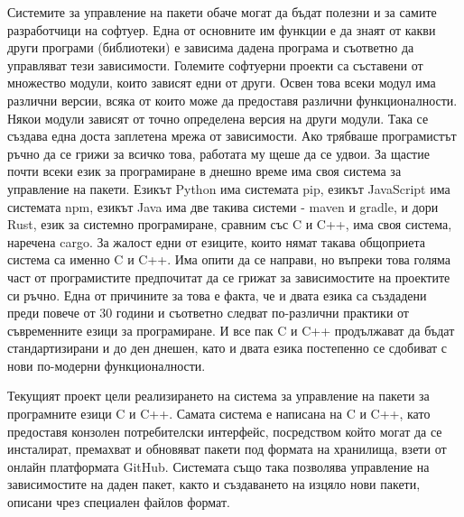 \documentclass[14pt]{extreport}
\begin{document}
Системите за управление на пакети обаче могат да бъдат полезни и за самите
разработчици на софтуер. Една от основните им функции е да знаят от какви други
програми (библиотеки) е зависима дадена програма и съответно да управляват тези
зависимости. Големите софтуерни проекти са съставени от множество модули, които
зависят едни от други. Освен това всеки модул има различни версии, всяка от
които може да предоставя различни функционалности. Някои модули зависят от точно
определена версия на други модули. Така се създава една доста заплетена мрежа от
зависимости. Ако трябваше програмистът ръчно да се грижи за всичко това,
работата му щеше да се удвои. За щастие почти всеки език за програмиране в
днешно време има своя система за управление на пакети. Езикът Python има
системата pip, езикът JavaScript има системата npm, езикът Java има две такива
системи - maven и gradle, и дори Rust, език за системно програмиране, сравним
със C и C++, има своя система, наречена cargo. За жалост едни от езиците, които
нямат такава общоприета система са именно C и C++. Има опити да се направи, но
въпреки това голяма част от програмистите предпочитат да се грижат за
зависимостите на проектите си ръчно. Една от причините за това е факта, че и
двата езика са създадени преди повече от 30 години и съответно следват
по-различни практики от съвременните езици за програмиране. И все пак C и C++
продължават да бъдат стандартизирани и до ден днешен, като и двата езика
постепенно се сдобиват с нови по-модерни функционалности.

Текущият проект цели реализирането на система за управление на пакети за
програмните езици C и C++. Самата система е написана на C и C++, като предоставя
конзолен потребителски интерфейс, посредством който могат да се инсталират,
премахват и обновяват пакети под формата на хранилища, взети от онлайн
платформата GitHub. Системата също така позволява управление на зависимостите
на даден пакет, както и създаването на изцяло нови пакети, описани чрез
специален файлов формат.


\end{document}
